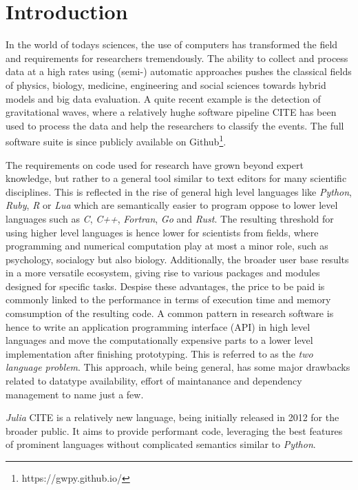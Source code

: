 \section{Introduction}
\label{JM:sec:introduction}

In the world of todays sciences, the use of computers has transformed the field and requirements for researchers tremendously. 
The ability to collect and process data at a high rates using (semi-) automatic approaches pushes the classical fields of 
physics, biology, medicine, engineering and social sciences towards hybrid models and big data evaluation. A quite recent example is the detection of gravitational waves, 
where a relatively hughe software pipeline CITE has been used to process the data and help the researchers to classify the events. The full software suite is since publicly available on Github\footnote{https://gwpy.github.io/}.


The requirements on code used for research have grown beyond expert knowledge, but rather to a general tool similar to text editors for many scientific disciplines. This is reflected in the rise of 
general high level languages like \textit{Python}, \textit{Ruby}, \textit{R} or \textit{Lua} which are semantically easier to program oppose to lower level languages such as 
\textit{C}, \textit{C++}, \textit{Fortran}, \textit{Go} and \textit{Rust}. The resulting threshold for using higher level languages is hence lower for scientists from fields, where programming and numerical
computation play at most a minor role, such as psychology, socialogy but also biology. Additionally, the broader user base results in a more versatile ecosystem, giving rise to various packages and modules designed
for specific tasks. Despise these advantages, the price to be paid is commonly linked to the performance in terms of execution time and memory comsumption of the resulting code. A common pattern in 
research software is hence to write an application programming interface (API) in high level languages and move the computationally expensive parts to a lower level implementation after finishing prototyping. This is referred to 
as the \textit{two language problem}. This approach, while being general, has some major drawbacks related to datatype availability, effort of maintanance and dependency management to name just a few.

\textit{Julia} CITE is a relatively new language, being initially released in 2012 for the broader public. It aims to provide performant code, leveraging the best features of 
prominent languages without complicated semantics similar to \textit{Python}. 

